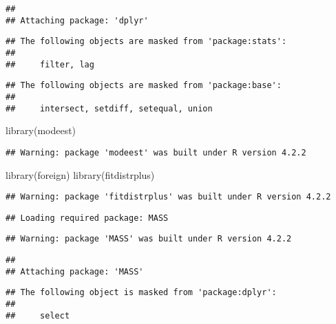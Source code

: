 \documentclass[
]{article}
\newenvironment{Shaded}{\begin{snugshade}}{\end{snugshade}}
\newcommand{\FunctionTok}[1]{\textcolor[rgb]{0.00,0.00,0.00}{#1}}
\newcommand{\NormalTok}[1]{#1}
\begin{document}
\begin{verbatim}
## 
## Attaching package: 'dplyr'
\end{verbatim}

\begin{verbatim}
## The following objects are masked from 'package:stats':
## 
##     filter, lag
\end{verbatim}

\begin{verbatim}
## The following objects are masked from 'package:base':
## 
##     intersect, setdiff, setequal, union
\end{verbatim}

\begin{Shaded}
\begin{Highlighting}[]
\FunctionTok{library}\NormalTok{(modeest)}
\end{Highlighting}
\end{Shaded}

\begin{verbatim}
## Warning: package 'modeest' was built under R version 4.2.2
\end{verbatim}

\begin{Shaded}
\begin{Highlighting}[]
\FunctionTok{library}\NormalTok{(foreign)}
\FunctionTok{library}\NormalTok{(fitdistrplus)}
\end{Highlighting}
\end{Shaded}

\begin{verbatim}
## Warning: package 'fitdistrplus' was built under R version 4.2.2
\end{verbatim}

\begin{verbatim}
## Loading required package: MASS
\end{verbatim}

\begin{verbatim}
## Warning: package 'MASS' was built under R version 4.2.2
\end{verbatim}

\begin{verbatim}
## 
## Attaching package: 'MASS'
\end{verbatim}

\begin{verbatim}
## The following object is masked from 'package:dplyr':
## 
##     select
\end{verbatim}
\end{document}

